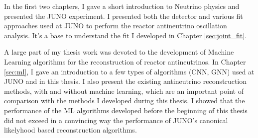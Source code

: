 \documentclass[../main.tex]{subfiles}
\begin{document}
\hfill

In the first two chapters, I gave a short introduction to Neutrino physics and presented the JUNO experiment. I presented both the detector and various fit approaches used at JUNO to perform the reactor antineutrino oscillation analysis. It's a base to understand the fit I developed in Chapter \ref{sec:joint_fit}.

A large part of my thesis work was devoted to the development of Machine Learning algorithms for the reconstruction of reactor antineutrinos. In Chapter \ref{sec:ml}, I gave an introduction to a few types of algorithms (CNN, GNN) used at JUNO and in this thesis. I also present the existing antineutrino reconstruction methods, with and without machine learning, which are an important point of comparison with the methods I developed during this thesis. I showed that the performance of the ML algorithms developed before the beginning of this thesis did not exceed in a convincing way the performance of JUNO's canonical likelyhood based reconstruction algorithms.


\hfill
\end{document}
